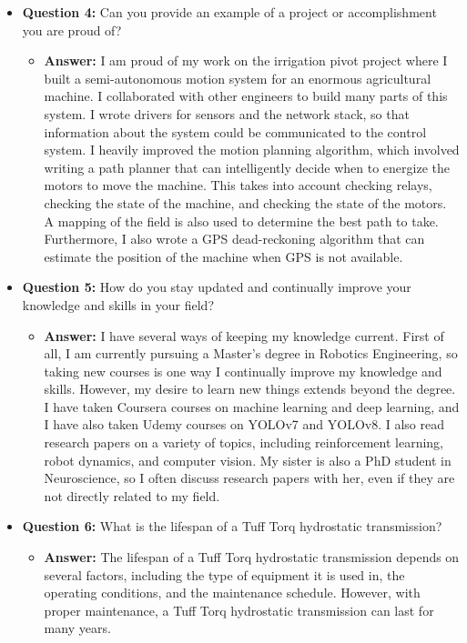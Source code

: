 \documentclass{article}
\begin{document}
\begin{itemize}
    \item \textbf{Question 4:} Can you provide an example of a project or accomplishment you are proud of?
    \begin{itemize}
        \item \textbf{Answer:} I am proud of my work on the irrigation pivot project
        where I built a semi-autonomous motion system for an enormous agricultural
        machine. I collaborated with other engineers to build many parts of this
        system. I wrote drivers for sensors and the network stack, so that 
        information about the system could be communicated to the control
        system. I heavily improved the motion planning algorithm, which
        involved writing a path planner that can intelligently decide
        when to energize the
        motors to move the machine. This takes into account checking
        relays, checking the state of the machine, and checking the
        state of the motors. A mapping of the field is also used to
        determine the best path to take.
        Furthermore, I also wrote a GPS dead-reckoning algorithm
        that can estimate the position of the machine when GPS is not available.
    \end{itemize}
    
    \item \textbf{Question 5:} How do you stay updated and continually improve your knowledge and skills in your field?
    \begin{itemize}
        \item \textbf{Answer:} I have several ways of keeping my knowledge current. First of all,
        I am currently pursuing a Master's degree in Robotics Engineering, so taking new courses
        is one way I continually improve my knowledge and skills. However, my 
        desire to learn new things extends beyond the degree. I have
        taken Coursera courses on machine learning and deep learning, and I
        have also taken Udemy courses on YOLOv7 and YOLOv8. I also read
        research papers on a variety of topics, including reinforcement learning,
        robot dynamics, and computer vision. My sister is also a PhD student
        in Neuroscience, so I often discuss research papers with her, even
        if they are not directly related to my field.\\
    \end{itemize}
    
    \item \textbf{Question 6:} What is the lifespan of a Tuff Torq hydrostatic transmission?
    \begin{itemize}
        \item \textbf{Answer:} The lifespan of a Tuff Torq hydrostatic transmission depends on several factors, including the type of equipment it is used in, the operating conditions, and the maintenance schedule. However, with proper maintenance, a Tuff Torq hydrostatic transmission can last for many years.
    \end{itemize}
    

\end{itemize}
\end{document}
